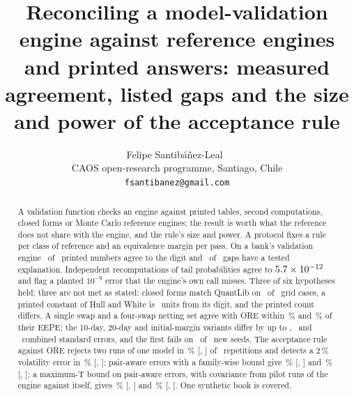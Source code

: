 \documentclass[11pt]{article}
\title{Reconciling a model-validation engine against reference engines and printed answers: measured agreement, listed gaps and the size and power of the acceptance rule}
\author{Felipe Santib\'a\~nez-Leal~\orcidlink{0000-0002-0150-3246}\\
\small CAOS open-research programme, Santiago, Chile\\
\small \texttt{fsantibanez@gmail.com}}
\date{\docdate}
\begin{document}
\maketitle
\headerblock

\begin{abstract}
A validation function checks an engine against printed tables, second computations, closed forms or Monte Carlo reference engines; the result is worth what the reference does not share with the engine, and the rule's size and power. A protocol fixes a rule per class of reference and an equivalence margin per pass. On a bank's validation engine \nPrintedAgree\ of \nPrintedN\ printed numbers agree to the digit and \nMissTested\ of \nMissTotal\ gaps have a tested explanation. Independent recomputations of tail probabilities agree to $5.7\times10^{-12}$ and flag a planted $10^{-9}$ error that the engine's own call misses. Three of six hypotheses held; three are not met as stated: closed forms match QuantLib on \nClosedWithin\ of \nClosedCases\ grid cases, a printed constant of Hull and White is \nWWAtwoUnits\ units from its digit, and the printed count differs. A single swap and a four-swap netting set agree with ORE within \nSingleEquivalence\,\% and \nNettingEquivalence\,\% of their EEPE; the 10-day, 20-day and initial-margin variants differ by up to \nCsaTenMaxZ, \nCsaTwentyMaxZ\ and \nImMaxZ\ combined standard errors, and the first fails on \nReplCsaFail\ of \nReplCsaN\ new seeds. The acceptance rule against ORE rejects two runs of one model in \nSizeProdNetting\,\% [\nSizeProdNettingLo, \nSizeProdNettingHi] of \nCritReps\ repetitions and detects a $2\,\%$ volatility error in \nPowerProdSigmaTwo\,\% [\nPowerProdSigmaTwoLo, \nPowerProdSigmaTwoHi]; pair-aware errors with a family-wise bound give \nSizeRefineNetting\,\% [\nSizeRefineNettingLo, \nSizeRefineNettingHi] and \nPowerRefineSigmaTwo\,\% [\nPowerRefineSigmaTwoLo, \nPowerRefineSigmaTwoHi]; a maximum-T bound on pair-aware errors, with covariance from pilot runs of the engine against itself, gives \nSizePairMaxtNetting\,\% [\nSizePairMaxtNettingLo, \nSizePairMaxtNettingHi] and \nPowerPairMaxtSigmaTwo\,\% [\nPowerPairMaxtSigmaTwoLo, \nPowerPairMaxtSigmaTwoHi]. One synthetic book is covered.
\end{abstract}
















\end{document}
